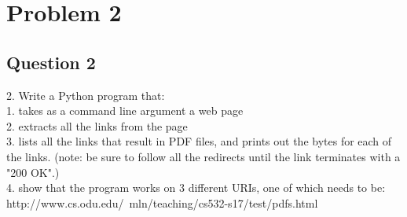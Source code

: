 \documentclass[10pt,letterpaper]{article}
\begin{document}
\pagebreak %


\section{Problem 2}
\subsection{Question 2}
2.  Write a Python program that:\\
  1. takes as a command line argument a web page\\
  2. extracts all the links from the page\\
  3. lists all the links that result in PDF files, and prints out the bytes for each of the links.  (note: be sure to follow all the redirects until the link terminates with a "200 OK".)\\
  4. show that the program works on 3 different URIs, one of which needs to be:\\
     http://www.cs.odu.edu/~mln/teaching/cs532-s17/test/pdfs.html
\end{document}
